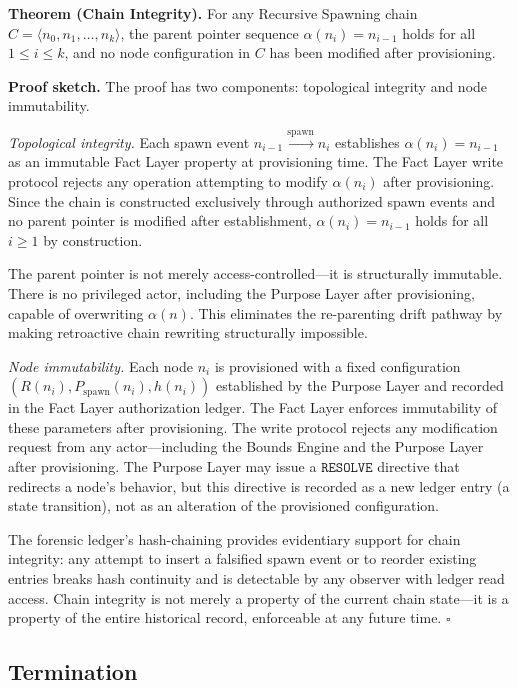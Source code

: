 \medskip
\noindent\textbf{Theorem (Chain Integrity).} For any Recursive Spawning chain $C = \langle n_0, n_1, \ldots, n_k \rangle$, the parent pointer sequence $\alpha(n_i) = n_{i-1}$ holds for all $1 \leq i \leq k$, and no node configuration in $C$ has been modified after provisioning.

\medskip
\noindent\textbf{Proof sketch.} The proof has two components: topological integrity and node immutability.

\medskip
\textit{Topological integrity.} Each spawn event $n_{i-1} \xrightarrow{\mathrm{spawn}} n_i$ establishes $\alpha(n_i) = n_{i-1}$ as an immutable Fact Layer property at provisioning time. The Fact Layer write protocol rejects any operation attempting to modify $\alpha(n_i)$ after provisioning. Since the chain is constructed exclusively through authorized spawn events and no parent pointer is modified after establishment, $\alpha(n_i) = n_{i-1}$ holds for all $i \geq 1$ by construction.

The parent pointer is not merely access-controlled---it is structurally immutable. There is no privileged actor, including the Purpose Layer after provisioning, capable of overwriting $\alpha(n)$. This eliminates the re-parenting drift pathway by making retroactive chain rewriting structurally impossible.

\medskip
\textit{Node immutability.} Each node $n_i$ is provisioned with a fixed configuration $(R(n_i), P_{\mathrm{spawn}}(n_i), h(n_i))$ established by the Purpose Layer and recorded in the Fact Layer authorization ledger. The Fact Layer enforces immutability of these parameters after provisioning. The write protocol rejects any modification request from any actor---including the Bounds Engine and the Purpose Layer after provisioning. The Purpose Layer may issue a $\texttt{RESOLVE}$ directive that redirects a node's behavior, but this directive is recorded as a new ledger entry (a state transition), not as an alteration of the provisioned configuration.

The forensic ledger's hash-chaining provides evidentiary support for chain integrity: any attempt to insert a falsified spawn event or to reorder existing entries breaks hash continuity and is detectable by any observer with ledger read access. Chain integrity is not merely a property of the current chain state---it is a property of the entire historical record, enforceable at any future time. $\square$

\subsection{Termination}
\label{sec:rs-termination}

